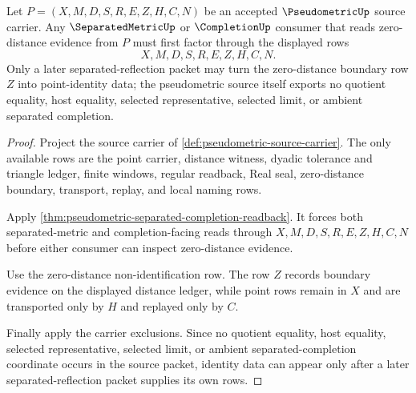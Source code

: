 \begin{theorem}
\label{thm:pseudometric-separated-reflection-factorization}
Let $P=(X,M,D,S,R,E,Z,H,C,N)$ be an accepted $\PseudometricUp$ source carrier. Any $\SeparatedMetricUp$ or $\CompletionUp$ consumer that reads zero-distance evidence from $P$ must first factor through the displayed rows
$$
X,M,D,S,R,E,Z,H,C,N .
$$
Only a later separated-reflection packet may turn the zero-distance boundary row $Z$ into point-identity data; the pseudometric source itself exports no quotient equality, host equality, selected representative, selected limit, or ambient separated completion.
\end{theorem}
\begin{proof}
Project the source carrier of \autoref{def:pseudometric-source-carrier}. The only available rows are the point carrier, distance witness, dyadic tolerance and triangle ledger, finite windows, regular readback, Real seal, zero-distance boundary, transport, replay, and local naming rows.

Apply \autoref{thm:pseudometric-separated-completion-readback}. It forces both separated-metric and completion-facing reads through $X,M,D,S,R,E,Z,H,C,N$ before either consumer can inspect zero-distance evidence.

Use the zero-distance non-identification row. The row $Z$ records boundary evidence on the displayed distance ledger, while point rows remain in $X$ and are transported only by $H$ and replayed only by $C$.

Finally apply the carrier exclusions. Since no quotient equality, host equality, selected representative, selected limit, or ambient separated-completion coordinate occurs in the source packet, identity data can appear only after a later separated-reflection packet supplies its own rows.
\end{proof}

